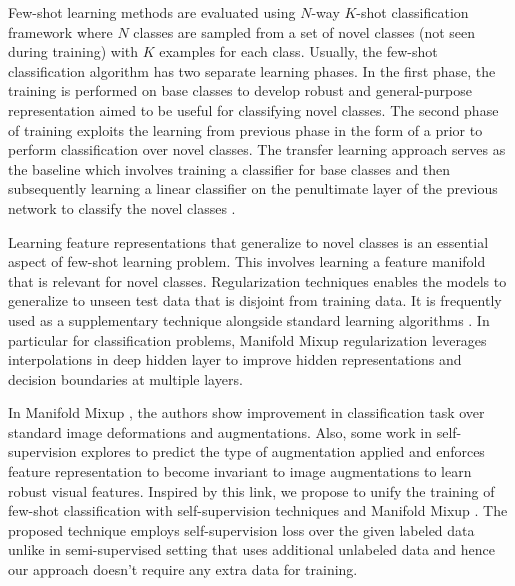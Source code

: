 \documentclass[10pt,twocolumn,letterpaper]{article}
\begin{document}
Few-shot learning methods are evaluated using $N$-way $K$-shot classification framework where $N$ classes are sampled from a set of novel classes (not seen during training) with $K$ examples for each class.
Usually, the few-shot classification algorithm has two separate learning phases. In the first phase, the training is performed on base classes to develop robust and general-purpose representation aimed to be useful for classifying novel classes. The second phase of training exploits the learning from previous phase in the form of a prior to perform classification over novel classes. The transfer learning approach serves as the baseline which involves training a classifier for base classes and then subsequently learning a linear classifier on the penultimate layer of the previous network to classify the novel classes \cite{chen2019closerfewshot}. 




Learning feature representations that generalize to novel classes is an essential aspect of few-shot learning problem. This involves learning a feature manifold that is relevant for novel classes. Regularization techniques enables the models to generalize to unseen test data that is disjoint from training data. It is frequently used as a supplementary technique alongside standard learning algorithms \cite{bn_2015_generalize,drop_2012_generalize,bishop_1995_generalize,verma2019manifold,zhang2018mixup}.
In particular for classification problems, Manifold Mixup \cite{verma2019manifold} regularization leverages interpolations in deep hidden layer to improve hidden representations and decision boundaries at multiple layers.





In Manifold Mixup \cite{verma2019manifold}, the authors show improvement in classification task over standard image deformations and augmentations. Also, some work in self-supervision \cite{Spyros2018rotate,s4l2019,exemplar2014} explores to predict the type of augmentation applied and enforces feature representation to become invariant to image augmentations to learn robust visual features. Inspired by this link, we propose to unify the training of few-shot classification with self-supervision techniques and Manifold Mixup \cite{verma2019manifold}. The proposed technique employs self-supervision loss over the given labeled data unlike in semi-supervised setting that uses additional unlabeled data and hence our approach doesn't require any extra data for training.
\end{document}
